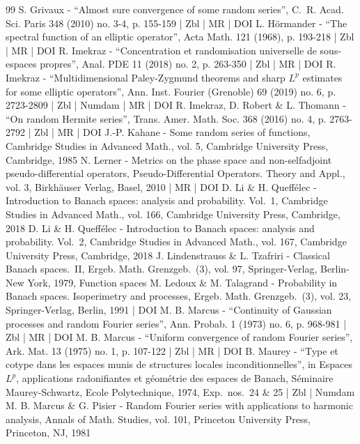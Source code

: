 \begin{thebibliography}{99}
S. Grivaux - “Almost sure convergence of some random series”, C. R. Acad. Sci. Paris 348 (2010) no. 3-4, p. 155-159 | Zbl | MR | DOI
L. Hörmander - “The spectral function of an elliptic operator”, Acta Math. 121 (1968), p. 193-218 | Zbl | MR | DOI
R. Imekraz - “Concentration et randomisation universelle de sous-espaces propres”, Anal. PDE 11 (2018) no. 2, p. 263-350 | Zbl | MR | DOI
R. Imekraz - “Multidimensional Paley-Zygmund theorems and sharp ${L}^p$ estimates for some elliptic operators”, Ann. Inst. Fourier (Grenoble) 69 (2019) no. 6, p. 2723-2809 | Zbl | Numdam | MR | DOI
R. Imekraz, D. Robert \& L. Thomann - “On random Hermite series”, Trans. Amer. Math. Soc. 368 (2016) no. 4, p. 2763-2792 | Zbl | MR | DOI
J.-P. Kahane - Some random series of functions, Cambridge Studies in Advanced Math., vol. 5, Cambridge University Press, Cambridge, 1985
N. Lerner - Metrics on the phase space and non-selfadjoint pseudo-differential operators, Pseudo-Differential Operators. Theory and Appl., vol. 3, Birkhäuser Verlag, Basel, 2010 | MR | DOI
D. Li \& H. Queffélec - Introduction to Banach spaces: analysis and probability. Vol. 1, Cambridge Studies in Advanced Math., vol. 166, Cambridge University Press, Cambridge, 2018
D. Li \& H. Queffélec - Introduction to Banach spaces: analysis and probability. Vol. 2, Cambridge Studies in Advanced Math., vol. 167, Cambridge University Press, Cambridge, 2018
J. Lindenstrauss \& L. Tzafriri - Classical Banach spaces. II, Ergeb. Math. Grenzgeb. (3), vol. 97, Springer-Verlag, Berlin-New York, 1979, Function spaces
M. Ledoux \& M. Talagrand - Probability in Banach spaces. Isoperimetry and processes, Ergeb. Math. Grenzgeb. (3), vol. 23, Springer-Verlag, Berlin, 1991 | DOI
M. B. Marcus - “Continuity of Gaussian processes and random Fourier series”, Ann. Probab. 1 (1973) no. 6, p. 968-981 | Zbl | MR | DOI
M. B. Marcus - “Uniform convergence of random Fourier series”, Ark. Mat. 13 (1975) no. 1, p. 107-122 | Zbl | MR | DOI
B. Maurey - “Type et cotype dans les espaces munis de structures locales inconditionnelles”, in Espaces $L^{p}$, applications radonifiantes et géométrie des espaces de Banach, Séminaire Maurey-Schwartz, Ecole Polytechnique, 1974, Exp. nos. 24 \& 25 | Zbl | Numdam
M. B. Marcus \& G. Pisier - Random Fourier series with applications to harmonic analysis, Annals of Math. Studies, vol. 101, Princeton University Press, Princeton, NJ, 1981

\end{thebibliography}
